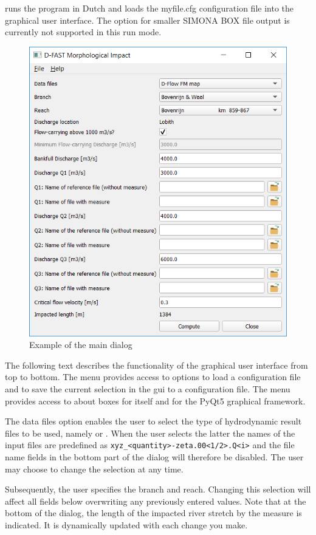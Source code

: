 runs the program in Dutch and loads the myfile.cfg configuration file into the graphical user interface.
The  option for smaller SIMONA BOX file output is currently not supported in this run mode.

\begin{figure}
\center
\includegraphics[width=12cm]{figures/main_dialog.png}
\caption{Example of the main dialog}
\end{figure}

The following text describes the functionality of the graphical user interface from top to bottom.
The  menu provides access to options to load a configuration file and to save the current selection in the gui to a configuration file.
The  menu provides access to about boxes for \dfastmi itself and for the PyQt5 graphical framework.

The data files option enables the user to select the type of hydrodynamic result files to be used, namely  or .
When the user selects the latter the names of the input files are predefined as \texttt{xyz\_<quantity>-zeta.00<1/2>.Q<i>} and the file name fields in the bottom part of the dialog will therefore be disabled.
The user may choose to change the selection at any time.

Subsequently, the user specifies the branch and reach.
Changing this selection will affect all fields below overwriting any previously entered values.
Note that at the bottom of the dialog, the length  of the impacted river stretch by the measure is indicated.
It is dynamically updated with each change you make.

